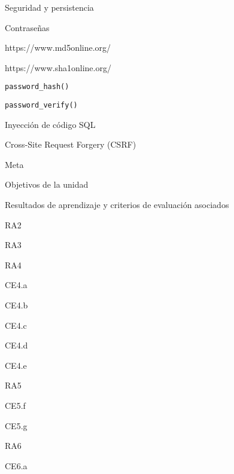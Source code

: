 \begin{longenum}
\begin{longenum}
\begin{longenum}
        \end{longenum}
        \item Seguridad y persistencia
        \begin{longenum}
            \item Contraseñas
            \begin{longenum}
                \item https://www.md5online.org/
                \item https://www.sha1online.org/
                \item \texttt{password\_hash()}
                \item \texttt{password\_verify()}
            \end{longenum}
            \item Inyección de código SQL
            \item Cross-Site Request Forgery (CSRF)
        \end{longenum}
        \item Meta
        \begin{longenum}
            \item Objetivos de la unidad
            \item Resultados de aprendizaje y criterios de evaluación asociados
            \begin{longenum}
                \item RA2
                \item RA3
                \item RA4
                \begin{longenum}
                    \item CE4.a
                    \item CE4.b
                    \item CE4.c
                    \item CE4.d
                    \item CE4.e
                \end{longenum}
                \item RA5
                \begin{longenum}
                    \item CE5.f
                    \item CE5.g
                \end{longenum}
                \item RA6
                \begin{longenum}
                    \item CE6.a

\end{longenum}
\end{longenum}
\end{longenum}
\end{longenum}
\end{longenum}
